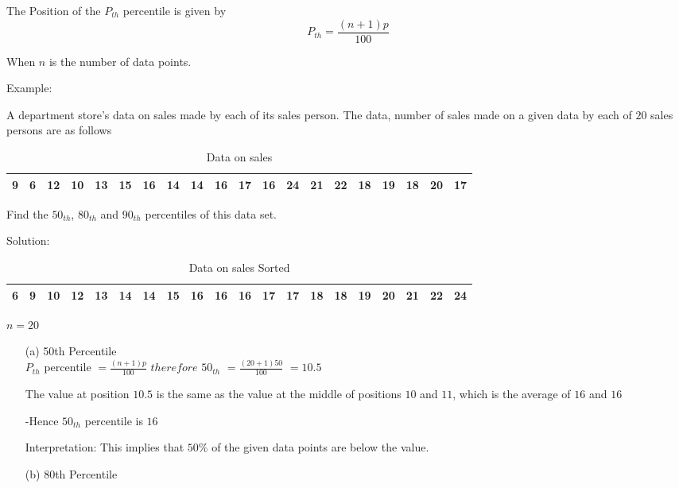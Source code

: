 \documentclass[12pt,a4paper]{article}
\begin{document}
The Position of the $P_{th}$ percentile is given by
\begin{equation}
    P_{th} = \frac{(n+1)p}{100}
\end{equation}

When $n$ is the number of data points.

Example:

A department store's data on sales made by each  of its sales person. The data, number of sales made on a given data by each of $20$ sales persons are as follows
\begin{table}[H]
    \centering
    \caption{Data on sales}
    \begin{tabular}{|*{20}{c|}}

        \hline
        9  & 6  & 12 & 10 & 13 & 15 & 16 & 14 & 14 & 16 &
        17 & 16 & 24 & 21 & 22 & 18 & 19 & 18 & 20 & 17   \\
        \hline
    \end{tabular}
\end{table}


Find the $50_{th}$, $80_{th}$ and $90_{th}$ percentiles of this data set.

Solution:
\begin{table}[H]
    \centering
    \caption{Data on sales Sorted}
    \begin{tabular}{|*{20}{c|}}

        \hline
        6 & 9 & 10 & 12 & 13 & 14 & 14 & 15 & 16 & 16 & 16 & 17 & 17 & 18 & 18 & 19 & 20 & 21 & 22 & 24 \\
        \hline
    \end{tabular}
\end{table}

$n = 20$

\begin{enumerate}
    \item[(a)]50th Percentile \\ $P_{th}$ percentile $= \frac{(n + 1)p}{100}$
    $therefore$ $50_{th}$ $= \frac{(20 + 1)50}{100}$
    $= 10.5$

    The value at position $10.5$ is the same as the value at the middle of positions $10$ and $11$, which is the average of $16$ and $16$

    -Hence $50_{th}$ percentile is $16$

    Interpretation: This implies that $50\%$ of the given data points are below the value.
    \item[(b)] 80th Percentile
\end{enumerate}
\end{document}
